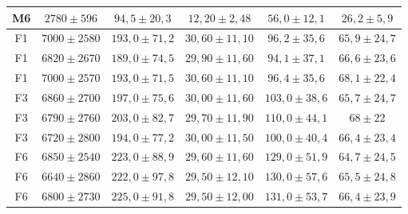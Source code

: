 \documentclass[conference]{IEEEtran}
\begin{document}
\begin{table}[htbp]
\begin{tabular}{cccccc}
M6 & $2780 \pm 596$ & $94,5 \pm 20,3$ & $12,20 \pm 2,48$ & $56,0 \pm 12,1$ & $26,2 \pm 5,9$ \\
\hline
F1 & $7000 \pm 2580$ & $193,0 \pm 71,2$ & $30,60 \pm 11,10$ & $96,2 \pm 35,6$ & $65,9 \pm 24,7$ \\
F1 & $6820 \pm 2670$ & $189,0 \pm 74,5$ & $29,90 \pm 11,60$ & $94,1 \pm 37,1$ & $66,6 \pm 23,6$ \\
F1 & $7000 \pm 2570$ & $193,0 \pm 71,5$ & $30,60 \pm 11,10$ & $96,4 \pm 35,6$ & $68,1 \pm 22,4$ \\
F3 & $6860 \pm 2700$ & $197,0 \pm 75,6$ & $30,00 \pm 11,60$ & $103,0 \pm 38,6$ & $65,7 \pm 24,7$ \\
F3 & $6790 \pm 2760$ & $203,0 \pm 82,7$ & $29,70 \pm 11,90$ & $110,0 \pm 44,1$ & $68 \pm 22$ \\
F3 & $6720 \pm 2800$ & $194,0 \pm 77,2$ & $30,00 \pm 11,50$ & $100,0 \pm 40,4$ & $66,4 \pm 23,4$ \\
F6 & $6850 \pm 2540$ & $223,0 \pm 88,9$ & $29,60 \pm 11,60$ & $129,0 \pm 51,9$ & $64,7 \pm 24,5$ \\
F6 & $6640 \pm 2860$ & $222,0 \pm 97,8$ & $29,50 \pm 12,10$ & $130,0 \pm 57,6$ & $65,5 \pm 24,8$ \\
F6 & $6800 \pm 2730$ & $225,0 \pm 91,8$ & $29,50 \pm 12,00$ & $131,0 \pm 53,7$ & $66,4 \pm 23,9$ \\
\hline
\end{tabular}
\end{table}
\end{document}
